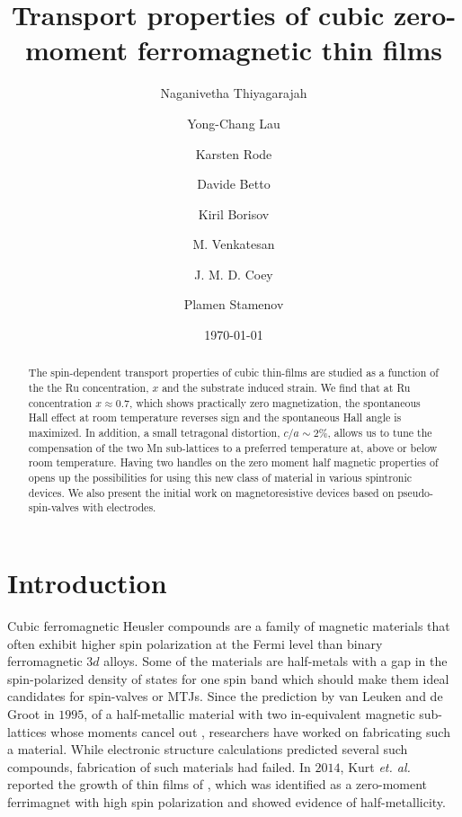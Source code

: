 \documentclass[reprint,aip,apl,floatfix,linenumbers,superscriptaddress]{revtex4-1}
\begin{document}
\title{Transport properties of cubic zero-moment ferromagnetic  thin films}
\author{Naganivetha Thiyagarajah}
\author{Yong-Chang Lau}
\author{Karsten Rode}
\author{Davide Betto}
\author{Kiril Borisov}
\author{M. Venkatesan}
\author{J. M. D. Coey}
\author{Plamen Stamenov}

\date{\today}

\begin{abstract}
The spin-dependent transport properties of cubic  thin-films are studied as a function of the the Ru concentration, $x$ and the substrate induced strain. We find that at Ru concentration $x\approx\num{0.7}$, which shows practically zero magnetization, the spontaneous Hall effect at room temperature reverses sign and the spontaneous Hall angle is maximized. In addition, a small tetragonal distortion, $c/a\sim\num{2}\%$, allows us to tune the compensation of the two Mn sub-lattices to a preferred temperature at, above or below room temperature. Having two handles on the zero moment half magnetic properties of  opens up the possibilities for using this new class of material in various spintronic devices. We also present the initial work on magnetoresistive devices based on pseudo-spin-valves with  electrodes.

\end{abstract}
\maketitle

\section{Introduction}
\label{sec:intro}

Cubic ferromagnetic Heusler compounds are a family of magnetic materials that often exhibit higher spin polarization at the Fermi level than binary ferromagnetic $3d$ alloys\cite{Graf2013}. Some of the materials are half-metals with a gap in the spin-polarized density of states for one spin band which should make them ideal candidates for spin-valves or MTJs\cite{PhysRevB.28.1745,Wang2009,Takahashi2011,Tsunegi2008}.  Since the prediction by van Leuken and de Groot in $1995$, of a half-metallic material with two in-equivalent magnetic sub-lattices whose moments cancel out \cite{PhysRevLett.50.2024}, researchers have worked on fabricating such a material. While electronic structure calculations predicted several such compounds\cite{Wurmehl2006, Hu2012, Galanakis2006}, fabrication of such materials had failed\cite{Hu2012,PhysRevB.79.100406}. In $2014$, Kurt \textit{et. al.} reported the growth of thin films of , which was identified as a zero-moment ferrimagnet with high spin polarization and showed evidence of half-metallicity\cite{KurtPRL2014}. 
\end{document}
